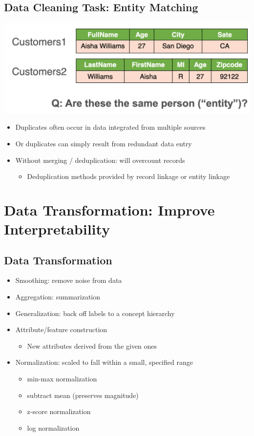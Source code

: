 \documentclass[11pt]{article}
\theoremstyle{definition}
\begin{document}
\subsection{Data Cleaning Task: Entity Matching}
\includegraphics[width=\textwidth]{17.png}
\begin{itemize}
    \item Duplicates often occur in data integrated from multiple sources
    \item Or duplicates can simply result from redundant data entry
    \item Without merging / deduplication: will overcount records
    \begin{itemize}
        \item Deduplication methods provided by record linkage or entity linkage
    \end{itemize}
\end{itemize}
\section{Data Transformation:
Improve Interpretability}
\subsection{Data Transformation}
\begin{itemize}
    \item Smoothing: remove noise from data
    \item Aggregation: summarization
    \item Generalization: back off labels to a concept hierarchy
    \item Attribute/feature construction
    \begin{itemize}
        \item New attributes derived from the given ones
    \end{itemize}
    \item Normalization: scaled to fall within a small, specified range
    \begin{itemize}
        \item min-max normalization
        \item subtract mean (preserves magnitude)
        \item z-score normalization
        \item log normalization
    \end{itemize}
\end{itemize}
\end{document}
